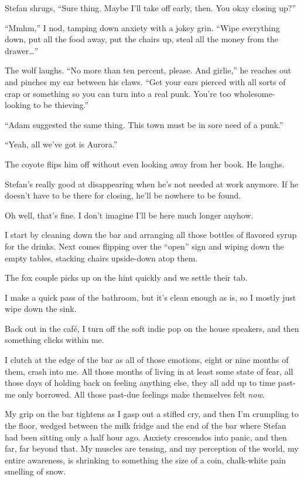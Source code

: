 Stefan shrugs, ``Sure thing. Maybe I'll take off early, then. You okay closing up?''

``Mmhm,'' I nod, tamping down anxiety with a jokey grin. ``Wipe everything down, put all the food away, put the chairs up, steal all the money from the drawer\ldots{}''

The wolf laughs. ``No more than ten percent, please. And girlie,'' he reaches out and pinches my ear between his claws. ``Get your ears pierced with all sorts of crap or something so you can turn into a real punk. You're too wholesome-looking to be thieving.''

``Adam suggested the same thing. This town must be in sore need of a punk.''

``Yeah, all we've got is Aurora.''

The coyote flips him off without even looking away from her book. He laughs.

\secdiv{}

\noindent Stefan's really good at disappearing when he's not needed at work anymore. If he doesn't have to be there for closing, he'll be nowhere to be found.

Oh well, that's fine. I don't imagine I'll be here much longer anyhow.

I start by cleaning down the bar and arranging all those bottles of flavored syrup for the drinks. Next comes flipping over the ``open'' sign and wiping down the empty tables, stacking chairs upside-down atop them.

The fox couple picks up on the hint quickly and we settle their tab.

I make a quick pass of the bathroom, but it's clean enough as is, so I mostly just wipe down the sink.

Back out in the café, I turn off the soft indie pop on the house speakers, and then something clicks within me.

I clutch at the edge of the bar as all of those emotions, eight or nine months of them, crash into me. All those months of living in at least some state of fear, all those days of holding back on feeling anything else, they all add up to time past-me only borrowed. All those past-due feelings make themselves felt \emph{now}.

My grip on the bar tightens as I gasp out a stifled cry, and then I'm crumpling to the floor, wedged between the milk fridge and the end of the bar where Stefan had been sitting only a half hour ago. Anxiety crescendos into panic, and then far, far beyond that. My muscles are tensing, and my perception of the world, my entire awareness, is shrinking to something the size of a coin, chalk-white pain smelling of snow.

